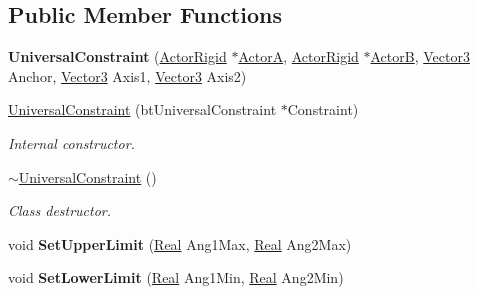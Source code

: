\subsection*{Public Member Functions}
\begin{DoxyCompactItemize}
\item 
\hypertarget{classphys_1_1UniversalConstraint_af08d5335171393e338b0617f99855701}{
{\bfseries UniversalConstraint} (\hyperlink{classphys_1_1ActorRigid}{ActorRigid} $\ast$\hyperlink{classphys_1_1TypedConstraint_a0fefb80c80d433bec9942b851b2f5a8a}{ActorA}, \hyperlink{classphys_1_1ActorRigid}{ActorRigid} $\ast$\hyperlink{classphys_1_1TypedConstraint_a04d2c49698d9a161e92112dd1efc1dcd}{ActorB}, \hyperlink{classphys_1_1Vector3}{Vector3} Anchor, \hyperlink{classphys_1_1Vector3}{Vector3} Axis1, \hyperlink{classphys_1_1Vector3}{Vector3} Axis2)}
\label{d0/d09/classphys_1_1UniversalConstraint_af08d5335171393e338b0617f99855701}

\item 
\hyperlink{classphys_1_1UniversalConstraint_af4d0828590b7fb242f601a171aa5db5f}{UniversalConstraint} (btUniversalConstraint $\ast$Constraint)
\begin{DoxyCompactList}\small\item\em Internal constructor. \item\end{DoxyCompactList}\item 
\hyperlink{classphys_1_1UniversalConstraint_aba3078f0f19a1a66c330d96f278e6fd8}{$\sim$UniversalConstraint} ()
\begin{DoxyCompactList}\small\item\em Class destructor. \item\end{DoxyCompactList}\item 
\hypertarget{classphys_1_1UniversalConstraint_a91e521aef75d4d32f91868ba31f486da}{
void {\bfseries SetUpperLimit} (\hyperlink{namespacephys_af7eb897198d265b8e868f45240230d5f}{Real} Ang1Max, \hyperlink{namespacephys_af7eb897198d265b8e868f45240230d5f}{Real} Ang2Max)}
\label{d0/d09/classphys_1_1UniversalConstraint_a91e521aef75d4d32f91868ba31f486da}

\item 
\hypertarget{classphys_1_1UniversalConstraint_a09b51abf3370f7834c9c1c2a326c57ca}{
void {\bfseries SetLowerLimit} (\hyperlink{namespacephys_af7eb897198d265b8e868f45240230d5f}{Real} Ang1Min, \hyperlink{namespacephys_af7eb897198d265b8e868f45240230d5f}{Real} Ang2Min)}
\label{d0/d09/classphys_1_1UniversalConstraint_a09b51abf3370f7834c9c1c2a326c57ca}

\end{DoxyCompactItemize}
